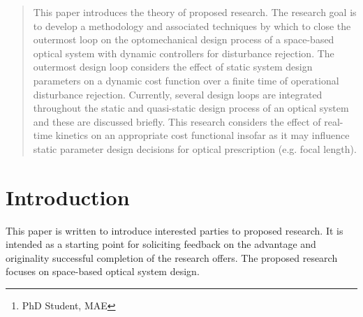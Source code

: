 \documentclass{aiaa-tc}
\author{Timothy E. Coon%
         \thanks{PhD Student, MAE}\\
         \normalsize\itshape
         FIT, Melbourne, Florida, 32901, USA}
\begin{document}
\maketitle

\begin{abstract}
This paper introduces the theory of proposed research. The research goal is to develop a methodology and associated techniques by which to close the outermost loop on the optomechanical design process of a space-based optical system with dynamic controllers for disturbance rejection. The outermost design loop considers the effect of static system design parameters on a dynamic cost function over a finite time of operational disturbance rejection. Currently, several design loops are integrated throughout the static and quasi-static design process of an optical system and these are discussed briefly. This research considers the effect of real-time kinetics on an appropriate cost functional insofar as it may influence static parameter design decisions for optical prescription (e.g. focal length).
\end{abstract}

%

\section{Introduction}

This paper is written to introduce interested parties to proposed research. It is intended as a starting point for soliciting feedback on the advantage and originality successful completion of the research offers. The proposed research focuses on space-based optical system design.
\end{document}
